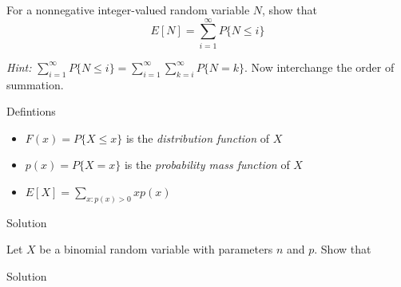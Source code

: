\documentclass{article}
\begin{document}
\begin{spacing}{1.1}
\maketitle

\newpage
\begin{homeworkProblem}
  For a nonnegative integer-valued random variable $N$, show that
  \[E[ N] = \sum\limits_{i = 1}^{\infty}{ P\{ N \le i\}}\]

  \emph{Hint:} $\sum\limits_{i = 1}^{\infty}{ P\{ N \le i\}} 
  = \sum\limits_{i = 1}^{ \infty}{ \sum\limits_{k = i}^{\infty}{P\{ N = k\}}}$.
  Now interchange the order of summation.
  \begin{homeworkSection}{Defintions}
    \begin{itemize}
      \item $F( x) = P\{ X \le x\}$ is the \emph{distribution function} of $X$
      \item $p( x) = P\{ X = x\}$ is the \emph{probability mass function} of $X$
      \item $E[ X] = \sum\limits_{x:p( x) > 0}{ x p( x)}$
    \end{itemize}
  \end{homeworkSection}
  \begin{homeworkSection}{Solution}
    
  

  \end{homeworkSection}
\end{homeworkProblem}
\newpage
\begin{homeworkProblem}
  Let $X$ be a binomial random variable with parameters $n$ and $p$. Show that 
  \begin{homeworkSection}{Solution}
    
  \end{homeworkSection}
\end{homeworkProblem}

  
\end{spacing}
\end{document}
